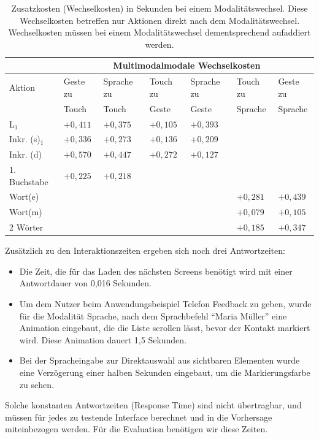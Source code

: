 \begin{table}[ht]
  \centering
		\begin{tabular}{|l|l|l|l|l|l|l|}
				\hline
				& \multicolumn{6}{|c|}{Multimodalmodale Wechselkosten}\\
				\hline
				Aktion 					& Geste zu		& Sprache zu 	& Touch zu		& Sprache zu		& Touch zu		& Geste zu\\
												& Touch 			& Touch 			& Geste 			& Geste					& Sprache 		& Sprache \\
				\hline
				L$_1$ 					& ${+0,411}$ 	&	${+0,375}$	& ${+0,105}$ 	&	${+0,393}$		& \multicolumn{2}{|c|}{}	\\
				\hline
				Inkr. (s)$_1$		& ${+0,336}$ 	&	${+0,273}$ 	& ${+0,136}$ 	&	${+0,209}$		& \multicolumn{2}{|c|}{}	\\
				\hline
				Inkr. (d) 					& ${+0,570}$ 	&	${+0,447}$ 	& ${+0,272}$ 	&	${+0,127}$		& \multicolumn{2}{|c|}{}	\\
				\hline
				1. Buchstabe		& ${+0,225}$ 	& ${+0,218}$ 	&	\multicolumn{2}{|c|}{}			& \multicolumn{2}{|c|}{}	\\
				\hline
				Wort(e) 	& \multicolumn{2}{|c|}{}	& \multicolumn{2}{|c|}{}				& ${+0,281}$ 		& ${+0,439}$\\
				\hline
				Wort(m)	& \multicolumn{2}{|c|}{}	& \multicolumn{2}{|c|}{}				& ${+0,079}$ 		& ${+0,105}$\\
				\hline
				2 Wörter 				& \multicolumn{2}{|c|}{}	& \multicolumn{2}{|c|}{}				& ${+0,185}$ 		& ${+0,347}$\\
				\hline
			\end{tabular}
	\caption[Wechselkosten eines Modalitätswechsels]{Zusatzkosten (Wechselkosten) in Sekunden bei einem Modalitätswechsel. Diese Wechselkosten betreffen nur Aktionen direkt nach dem Modalitätswechsel. Wechselkosten müssen bei einem Modalitätswechsel dementsprechend aufaddiert werden.}
	\label{tab:Wechselkosten}
\end{table}

Zusätzlich zu den Interaktionszeiten ergeben sich noch drei Antwortzeiten:
\begin{itemize}
\item Die Zeit, die für das Laden des nächsten Screens benötigt wird mit einer Antwortdauer von 0,016 Sekunden.
\item Um dem Nutzer beim Anwendungsbeispiel Telefon Feedback zu geben, wurde für die Modalität Sprache, nach dem Sprachbefehl "`Maria Müller"' eine Animation eingebaut, die die Liste scrollen lässt, bevor der Kontakt markiert wird.
Diese Animation dauert 1,5 Sekunden.
\item Bei der Spracheingabe zur Direktauswahl aus sichtbaren Elementen wurde eine Verzögerung einer halben Sekunden eingebaut, um die Markierungsfarbe zu sehen.
\end{itemize}
Solche konstanten Antwortzeiten (Response Time) sind nicht übertragbar, und müssen für jedes zu testende Interface berechnet und in die Vorhersage miteinbezogen werden.
Für die Evaluation benötigen wir diese Zeiten.
\clearpage

